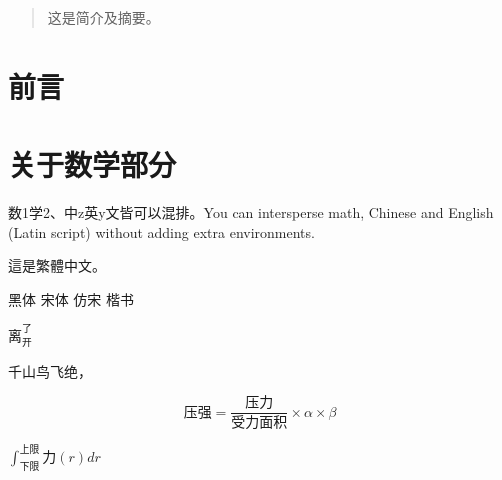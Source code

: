 \documentclass[CJKecglue]{ctexart}
\begin{document}
\tableofcontents

\begin{abstract}
这是简介及摘要。
\end{abstract}

\section{前言}

\section{关于数学部分}

{数1学2}、中z英y文皆可以混排。You can intersperse math, Chinese and English (Latin script) without adding extra environments.

這是繁體中文。

{\heiti 黑体} {\songti 宋体} {\fangsong 仿宋} {\kaishu 楷书}

$离_开^了$

千山鸟飞绝，


\[ 压强=\frac{压力}{受力面积}\times \alpha \times β \]

$ \int_{下限}^{上限} 力(r)dr $

\inputminted[linenos,frame=lines,framesep=2mm,breaklines,breaksymbolleft={},fontsize=\small]{c++}{环城2.cpp}
\end{document}
